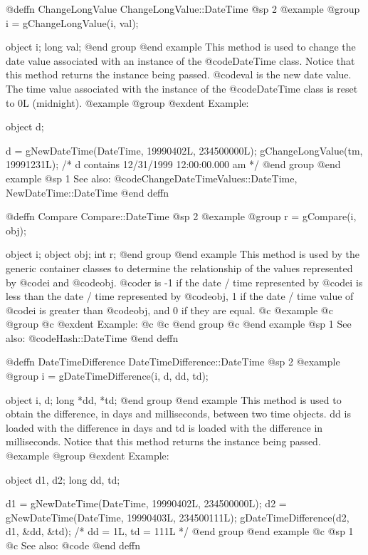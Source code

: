 @deffn {ChangeLongValue} ChangeLongValue::DateTime
@sp 2
@example
@group
i = gChangeLongValue(i, val);

object  i;
long    val;
@end group
@end example
This method is used to change the date value associated with an 
instance of the @code{DateTime} class.  Notice that this method
returns the instance being passed.  @code{val} is the new date value.
The time value associated with the instance of the @code{DateTime}
class is reset to 0L (midnight).
@example
@group
@exdent Example:

object  d;

d = gNewDateTime(DateTime, 19990402L, 234500000L);
gChangeLongValue(tm, 19991231L);
/*  d contains 12/31/1999 12:00:00.000 am  */
@end group
@end example
@sp 1
See also:  @code{ChangeDateTimeValues::DateTime, NewDateTime::DateTime}
@end deffn










@deffn {Compare} Compare::DateTime
@sp 2
@example
@group
r = gCompare(i, obj);

object  i;
object  obj;
int     r;
@end group
@end example
This method is used by the generic container classes to determine
the relationship of the values represented by @code{i} and @code{obj}. 
@code{r} is -1 if the date / time represented by @code{i} is less than
the date / time represented by @code{obj}, 1 if the date / time value of
@code{i} is greater than @code{obj}, and 0 if they are equal.
@c @example
@c @group
@c @exdent Example:
@c
@c @end group
@c @end example
@sp 1
See also:  @code{Hash::DateTime}
@end deffn







@deffn {DateTimeDifference} DateTimeDifference::DateTime
@sp 2
@example
@group
i = gDateTimeDifference(i, d, dd, td);

object  i, d;
long    *dd, *td;
@end group
@end example
This method is used to obtain the difference, in days and milliseconds,
between two time objects.  dd is loaded with the difference in days
and td is loaded with the difference in milliseconds.  Notice that this
method returns the instance being passed.  
@example
@group
@exdent Example:

object  d1, d2;
long    dd, td;

d1 = gNewDateTime(DateTime, 19990402L, 234500000L);
d2 = gNewDateTime(DateTime, 19990403L, 234500111L);
gDateTimeDifference(d2, d1, &dd, &td);
/*  dd = 1L, td = 111L  */
@end group
@end example
@c @sp 1
@c See also:  @code{}
@end deffn








